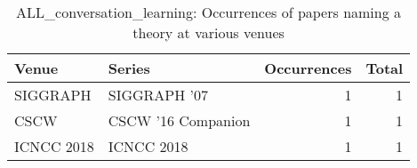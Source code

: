 \begin{table*}[t]
\begin{tabular}{llrr}
Venue & Series & Occurrences & Total\\\hline
\multirow{1}{*}{SIGGRAPH } & SIGGRAPH '07 & 1 & \multirow{1}{*}{1}\\
\multirow{1}{*}{CSCW } & CSCW '16 Companion & 1 & \multirow{1}{*}{1}\\
\multirow{1}{*}{ICNCC 2018} & ICNCC 2018 & 1 & \multirow{1}{*}{1}\\
\end{tabular}
\caption{ALL\_conversation\_learning: Occurrences of papers naming a theory at various venues}
\end{table*}